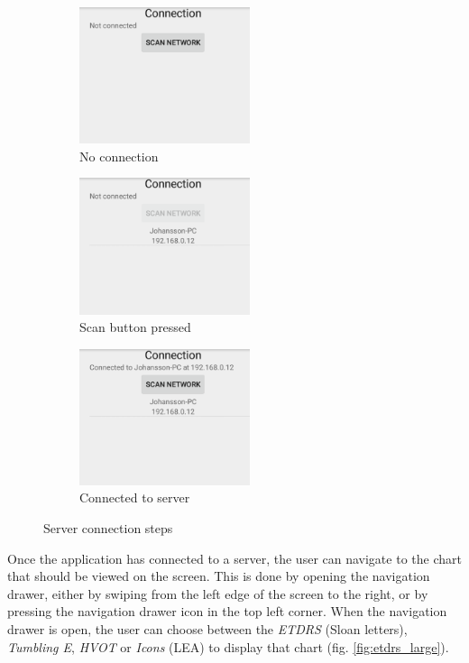 \documentclass[12pt,a4paper,notitlepage]{report}
\begin{document}
\begin{figure}[ht!]
\centering
\begin{subfigure}{.5\textwidth}
  \centering
  \includegraphics[width=50mm]{images/appgui/scan1.png}
  \caption{No connection}
  \label{fig:scan1}
\end{subfigure}%
\begin{subfigure}{.5\textwidth}
  \centering
  \includegraphics[width=50mm]{images/appgui/scan2.png}
  \caption{Scan button pressed}
  \label{fig:scan2}
\end{subfigure}
\begin{subfigure}{.5\textwidth}
  \centering
  \includegraphics[width=50mm]{images/appgui/scan3.png}
  \caption{Connected to server}
  \label{fig:scan3}
\end{subfigure}
\caption{Server connection steps}
\label{fig:scan}
\end{figure}

Once the application has connected to a server, the user can navigate to the chart that should be viewed on the screen. This is done by opening the navigation drawer, either by swiping from the left edge of the screen to the right, or by pressing the navigation drawer icon in the top left corner. When the navigation drawer is open, the user can choose between the \textit{ETDRS} (Sloan letters), \textit{Tumbling E}, \textit{HVOT} or \textit{Icons} (LEA) to display that chart (fig. \ref{fig:etdrs_large}). 
\end{document}
